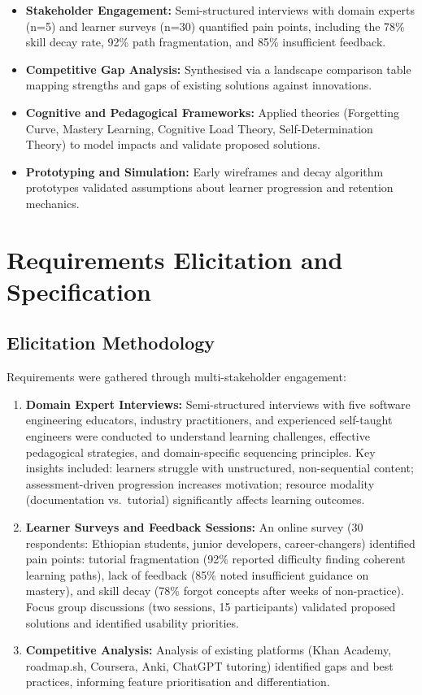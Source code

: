 \begin{itemize}
    \item \textbf{Stakeholder Engagement:} Semi-structured interviews with domain experts (n=5) and learner surveys (n=30) quantified pain points, including the 78\% skill decay rate, 92\% path fragmentation, and 85\% insufficient feedback.
    \item \textbf{Competitive Gap Analysis:} Synthesised via a landscape comparison table mapping strengths and gaps of existing solutions against \projectname{} innovations.
    \item \textbf{Cognitive and Pedagogical Frameworks:} Applied theories (Forgetting Curve, Mastery Learning, Cognitive Load Theory, Self-Determination Theory) to model impacts and validate proposed solutions.
    \item \textbf{Prototyping and Simulation:} Early wireframes and decay algorithm prototypes validated assumptions about learner progression and retention mechanics.
\end{itemize}

\section{Requirements Elicitation and Specification}

\subsection*{Elicitation Methodology}

Requirements were gathered through multi-stakeholder engagement:

\begin{enumerate}
    \item \textbf{Domain Expert Interviews:} Semi-structured interviews with five software engineering educators, industry practitioners, and experienced self-taught engineers were conducted to understand learning challenges, effective pedagogical strategies, and domain-specific sequencing principles. Key insights included: learners struggle with unstructured, non-sequential content; assessment-driven progression increases motivation; resource modality (documentation vs.\ tutorial) significantly affects learning outcomes.
    \item \textbf{Learner Surveys and Feedback Sessions:} An online survey (30 respondents: Ethiopian students, junior developers, career-changers) identified pain points: tutorial fragmentation (92\% reported difficulty finding coherent learning paths), lack of feedback (85\% noted insufficient guidance on mastery), and skill decay (78\% forgot concepts after weeks of non-practice). Focus group discussions (two sessions, 15 participants) validated proposed solutions and identified usability priorities.
    \item \textbf{Competitive Analysis:} Analysis of existing platforms (Khan Academy, roadmap.sh, Coursera, Anki, ChatGPT tutoring) identified gaps and best practices, informing feature prioritisation and differentiation.
\end{enumerate}

